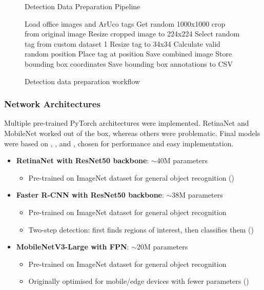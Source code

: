 \documentclass[conference]{IEEEtran}
\begin{document}
\begin{figure}[H]
\begin{algorithm}[H]
\caption{Detection Data Preparation Pipeline}
\begin{algorithmic}[1]
\STATE Load office images and ArUco tags
    \STATE Get random 1000x1000 crop from original image
    \STATE Resize cropped image to 224x224
        \STATE Select random tag from custom dataset 1
        \STATE Resize tag to 34x34
        \STATE Calculate valid random position
        \STATE Place tag at position
        \STATE Save combined image
        \STATE Store bounding box coordinates
    \ENDFOR
\ENDFOR
\STATE Save bounding box annotations to CSV
\end{algorithmic}
\end{algorithm}
\caption{Detection data preparation workflow}
\end{figure}

\subsubsection{Network Architectures}

Multiple pre-trained PyTorch architectures were implemented. RetinaNet and MobileNet worked out of the box, whereas others were
problematic. Final models were based on \textcite{pytorch_retinanet}, \textcite{pytorch_fasterrcnn}, and \textcite{pytorch_mobilenet_rcnn},
chosen for performance and easy implementation.

\begin{itemize}
    \item \textbf{RetinaNet with ResNet50 backbone}: $\sim$40M parameters
    \begin{itemize}
        \item Pre-trained on ImageNet dataset for general object recognition (\cite{pytorch_retinanet})
    \end{itemize}
    
    \item \textbf{Faster R-CNN with ResNet50 backbone}: $\sim$38M parameters
    \begin{itemize}
        \item Pre-trained on ImageNet dataset for general object recognition
        \item Two-step detection: first finds regions of interest, then classifies them (\cite{pytorch_fasterrcnn})
    \end{itemize}
    
    \item \textbf{MobileNetV3-Large with FPN}: $\sim$20M parameters
    \begin{itemize}
        \item Pre-trained on ImageNet dataset for general object recognition
        \item Originally optimised for mobile/edge devices with fewer parameters (\cite{pytorch_mobilenet_rcnn})
    \end{itemize}
\end{itemize}
\end{document}

